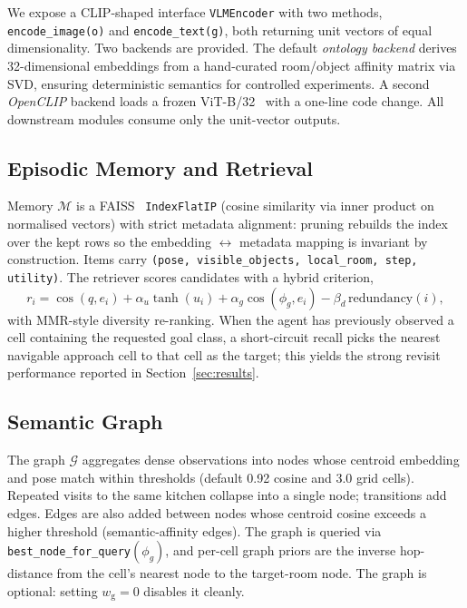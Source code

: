 \documentclass[conference,a4paper,10pt]{IEEEtran}
\begin{document}
We expose a CLIP-shaped interface \texttt{VLMEncoder} with two methods,
\texttt{encode\_image(o)} and \texttt{encode\_text(g)}, both returning
unit vectors of equal dimensionality. Two backends are provided. The
default \emph{ontology backend} derives 32-dimensional embeddings from a
hand-curated room/object affinity matrix via SVD, ensuring deterministic
semantics for controlled experiments. A second \emph{OpenCLIP} backend
loads a frozen ViT-B/32~\cite{radford2021clip} with a one-line code change. All downstream
modules consume only the unit-vector outputs.

\subsection{Episodic Memory and Retrieval}

Memory $\mathcal{M}$ is a FAISS~\cite{johnson2019faiss} \texttt{IndexFlatIP} (cosine similarity
via inner product on normalised vectors) with strict metadata
alignment: pruning rebuilds the index over the kept rows so the
embedding $\leftrightarrow$ metadata mapping is invariant by
construction. Items carry \texttt{(pose, visible\_objects, local\_room,
step, utility)}. The retriever scores candidates with a hybrid
criterion,
\[
r_i = \cos(q, e_i) + \alpha_u \tanh(u_i) + \alpha_g \cos(\phi_g, e_i)
       - \beta_d \, \mathrm{redundancy}(i),
\]
with MMR-style diversity re-ranking. When the agent has previously
observed a cell containing the requested goal class, a short-circuit
recall picks the nearest navigable approach cell to that cell as the
target; this yields the strong revisit performance reported in
Section~\ref{sec:results}.

\subsection{Semantic Graph}

The graph $\mathcal{G}$ aggregates dense observations into nodes whose
centroid embedding and pose match within thresholds (default 0.92
cosine and 3.0 grid cells). Repeated visits to the same kitchen
collapse into a single node; transitions add edges. Edges are also
added between nodes whose centroid cosine exceeds a higher threshold
(semantic-affinity edges). The graph is queried via
\texttt{best\_node\_for\_query}$(\phi_g)$, and per-cell graph priors are
the inverse hop-distance from the cell's nearest node to the
target-room node. The graph is optional: setting $w_{\mathrm{g}}=0$
disables it cleanly.
\end{document}
